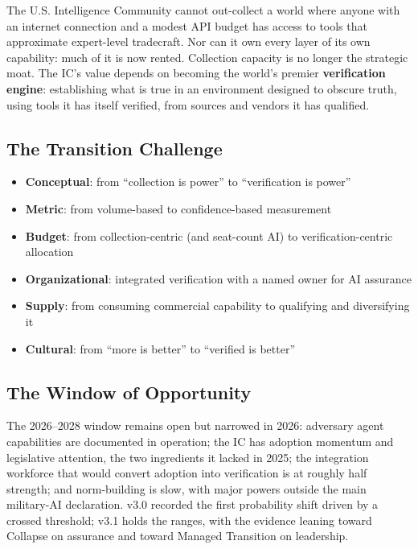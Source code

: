 \documentclass[11pt,letterpaper]{article}
\begin{document}
The U.S. Intelligence Community cannot out-collect a world where anyone with an internet connection and a modest API budget has access to tools that approximate expert-level tradecraft. Nor can it own every layer of its own capability: much of it is now rented. Collection capacity is no longer the strategic moat. The IC's value depends on becoming the world's premier \textbf{verification engine}: establishing what is true in an environment designed to obscure truth, using tools it has itself verified, from sources and vendors it has qualified.

\subsection{The Transition Challenge}

\begin{itemize}[nosep]
  \item \textbf{Conceptual}: from ``collection is power'' to ``verification is power''
  \item \textbf{Metric}: from volume-based to confidence-based measurement
  \item \textbf{Budget}: from collection-centric (and seat-count AI) to verification-centric allocation
  \item \textbf{Organizational}: integrated verification with a named owner for AI assurance
  \item \textbf{Supply}: from consuming commercial capability to qualifying and diversifying it
  \item \textbf{Cultural}: from ``more is better'' to ``verified is better''
\end{itemize}

\subsection{The Window of Opportunity}

The 2026--2028 window remains open but narrowed in 2026: adversary agent capabilities are documented in operation; the IC has adoption momentum and legislative attention, the two ingredients it lacked in 2025; the integration workforce that would convert adoption into verification is at roughly half strength; and norm-building is slow, with major powers outside the main military-AI declaration. v3.0 recorded the first probability shift driven by a crossed threshold; v3.1 holds the ranges, with the evidence leaning toward Collapse on assurance and toward Managed Transition on leadership.
\end{document}
